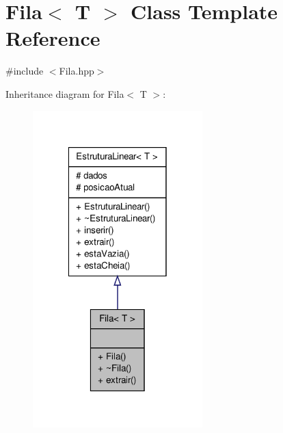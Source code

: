 \hypertarget{classFila}{\section{\-Fila$<$ \-T $>$ \-Class \-Template \-Reference}
\label{classFila}
}


{\ttfamily \#include $<$\-Fila.\-hpp$>$}



\-Inheritance diagram for \-Fila$<$ \-T $>$\-:\nopagebreak
\begin{figure}[H]
\begin{center}
\leavevmode
\includegraphics[width=186pt]{classFila__inherit__graph}
\end{center}
\end{figure}


